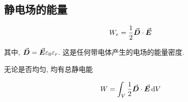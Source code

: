 \subsection{静电场的能量}

\begin{equation}
	W_e = \dfrac{1}{2} \va*{D} \cdot \va*{E} \label{C7-eq27}
\end{equation}

其中, $\va*{D} = \va*{E}\varepsilon_0\varepsilon_r$. 这是任何带电体产生的电场的能量密度. 

无论是否均匀, 均有总静电能

\begin{equation}
	W = \int_{V}{\dfrac{1}{2}\va*{D}\cdot\va*{E} \dd{V}} \label{C7-eq28}
\end{equation}
